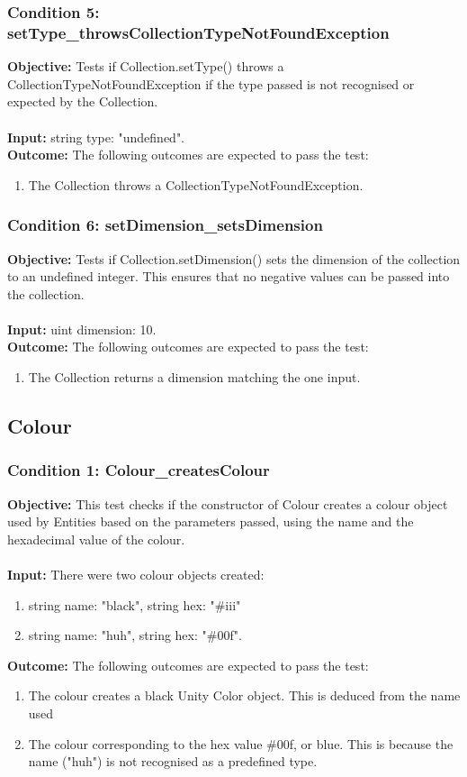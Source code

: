 \documentclass[a4paper,12pt]{article}
\begin{document}
		\subsubsection{Condition 5: setType\_throwsCollectionTypeNotFoundException}
			\textbf{Objective:} Tests if Collection.setType() throws a CollectionTypeNotFoundException if the type passed is not recognised or expected by the Collection.\\\\
			\textbf{Input:} string type: "undefined".\\
			\textbf{Outcome:} The following outcomes are expected to pass the test:
				\begin{enumerate}
					\item The Collection throws a CollectionTypeNotFoundException.
				\end{enumerate}
		\subsubsection{Condition 6: setDimension\_setsDimension}
			\textbf{Objective:} Tests if Collection.setDimension() sets the dimension of the collection to an undefined integer. This ensures that no negative values can be passed into the collection.\\\\
			\textbf{Input:} uint dimension: 10.\\
			\textbf{Outcome:} The following outcomes are expected to pass the test:
				\begin{enumerate}
					\item The Collection returns a dimension matching the one input.
				\end{enumerate}
	\subsection{Colour}
		\subsubsection{Condition 1: Colour\_createsColour}
			\textbf{Objective:} This test checks if the constructor of Colour creates a colour object used by Entities based on the parameters passed, using the name and the hexadecimal value of the colour.\\\\
			\textbf{Input:} There were two colour objects created:
				\begin{enumerate}
					\item string name: "black", string hex: "\#iii"
					\item string name: "huh", string hex: "\#00f".
				\end{enumerate}
			\textbf{Outcome:} The following outcomes are expected to pass the test:
				\begin{enumerate}
					\item The colour creates a black Unity Color object. This is deduced from the name used
					\item The colour corresponding to the hex value \#00f, or blue. This is because the name ("huh") is not recognised as a predefined type.
				\end{enumerate}
\end{document}
